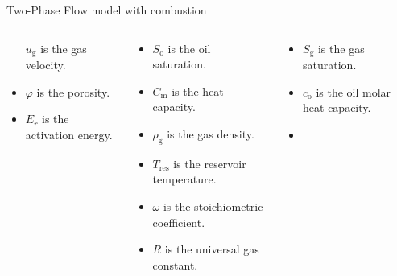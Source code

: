 \documentclass[
    8pt,
    aspectratio=1610,
    c,
    intlimits,
    leqno,
    professionalfonts,
]{beamer}
\begin{document}
\begin{frame}
\begin{block}{Two-Phase Flow model with combustion~\cite{Gargar2020}}
\begin{columns}
\begin{column}{.3\paperwidth}
\begin{itemize}
					      $u_{\text{g}}$ is the gas velocity.

					\item

					      $\varphi$ is the porosity.

					\item

					      $E_{r}$ is the activation energy.


				\end{itemize}
			\end{column}
			\begin{column}{.3\paperwidth}
				\begin{itemize}
					\item

					      $S_{\text{o}}$ is the oil saturation.

					\item

					      $C_{\text{m}}$ is the heat capacity.

					\item

					      $\rho_{\text{g}}$ is the gas density.

					\item

					      $T_{\text{res}}$ is the reservoir temperature.

					\item

					      $\omega$ is the stoichiometric coefficient.

					\item

					      $R$ is the universal gas constant.
				\end{itemize}
			\end{column}
			\begin{column}{.3\paperwidth}
				\begin{itemize}
					\item

					      $S_{\text{g}}$ is the gas saturation.

					\item


					      $c_{\text{o}}$ is the oil molar heat capacity.


					\item


\end{itemize}
\end{column}
\end{columns}
\end{block}
\end{frame}
\end{document}
